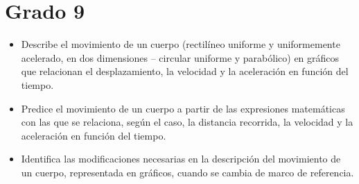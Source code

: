 \section{Grado 9}\label{grado:9}


\evidencias

\begin{itemize}
  \item Describe el movimiento de un cuerpo (rectilíneo uniforme y uniformemente acelerado, en dos dimensiones – circular uniforme y parabólico) en gráficos que relacionan el desplazamiento, la velocidad y la aceleración en función del tiempo.
  \item Predice el movimiento de un cuerpo a partir de las expresiones matemáticas con las que se relaciona, según el caso, la distancia recorrida, la velocidad y la aceleración en función del tiempo.
  \item Identifica las modificaciones necesarias en la descripción del movimiento de un cuerpo, representada en gráficos, cuando se cambia de marco de referencia.
\end{itemize}

\ejemplo




